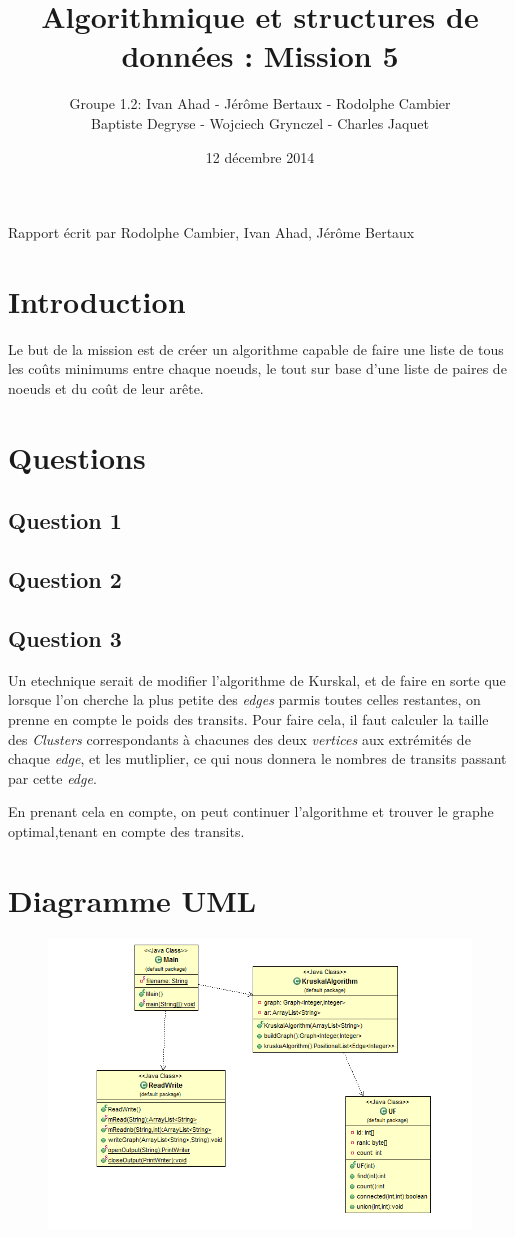 \documentclass[a4paper]{article}
\title{Algorithmique et structures de données : Mission 5}
\date{12 décembre 2014}
\author{Groupe 1.2: Ivan Ahad - Jérôme Bertaux - Rodolphe Cambier \\ 
	Baptiste Degryse - Wojciech Grynczel - Charles Jaquet}
\begin{document}
\maketitle


Rapport écrit par Rodolphe Cambier, Ivan Ahad, Jérôme Bertaux
\section*{Introduction}
Le but de la mission est de créer un algorithme capable de faire une liste de tous les coûts minimums entre chaque noeuds, le tout sur base d'une liste de paires de noeuds et du coût de leur arête. 
\section*{Questions}

\subsection*{Question 1}

\subsection*{Question 2}

\subsection*{Question 3}

Un etechnique serait de modifier l'algorithme de Kurskal, et de faire en sorte que lorsque l'on cherche la plus petite des \textit{edges} parmis toutes celles restantes, on prenne en compte le poids des transits. Pour faire cela, il faut calculer la taille des \textit{Clusters} correspondants à chacunes des deux \textit{vertices} aux extrémités de chaque \textit{edge}, et les mutliplier, ce qui nous donnera le nombres de transits passant par cette \textit{edge}.

En prenant cela en compte, on peut continuer l'algorithme et trouver le graphe optimal,tenant en compte des transits.



\section*{Diagramme UML}
\begin{figure}[b]
   \includegraphics[scale=0.4]{UML.png}
\end{figure}
\end{document}
